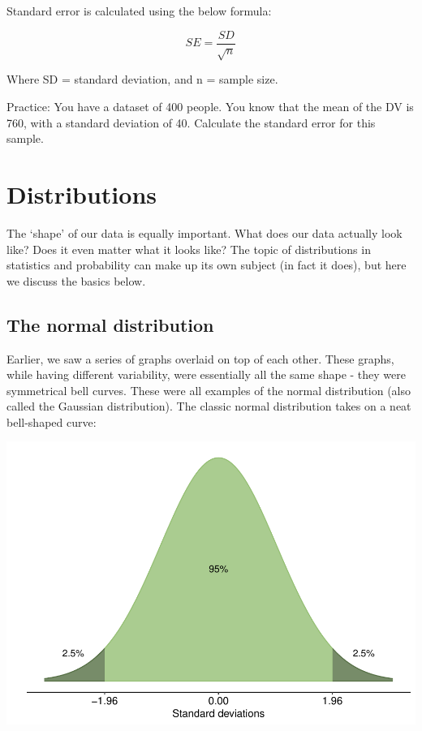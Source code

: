 \documentclass[
]{book}
\begin{document}
Standard error is calculated using the below formula:

\[
SE = \frac{SD}{\sqrt n}
\]

Where SD = standard deviation, and n = sample size.

Practice: You have a dataset of 400 people. You know that the mean of the DV is 760, with a standard deviation of 40. Calculate the standard error for this sample.

\section{Distributions}\label{distributions}

The `shape' of our data is equally important. What does our data actually look like? Does it even matter what it looks like? The topic of distributions in statistics and probability can make up its own subject (in fact it does), but here we discuss the basics below.

\subsection{The normal distribution}\label{normal-dist}

Earlier, we saw a series of graphs overlaid on top of each other. These graphs, while having different variability, were essentially all the same shape - they were symmetrical bell curves. These were all examples of the normal distribution (also called the Gaussian distribution). The classic normal distribution takes on a neat bell-shaped curve:

\begin{center}\includegraphics{_main_files/figure-latex/unnamed-chunk-80-1} \end{center}
\end{document}
